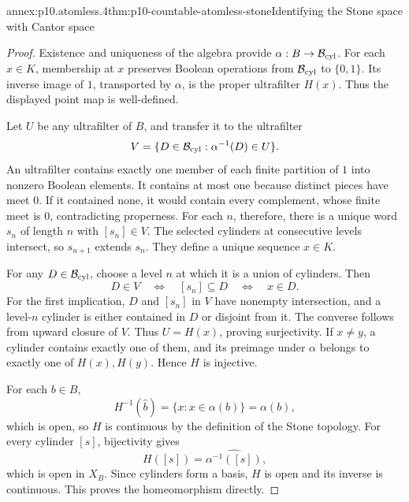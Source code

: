 \begin{annexitem}{annex:p10.atomless.4}{thm:p10-countable-atomless-stone}{Identifying the Stone space with Cantor space}
\begin{proof}
Existence and uniqueness of the algebra provide
\(\alpha:B\to\mathcal B_{\rm cyl}\).
For each \(x\in K\), membership at \(x\) preserves Boolean
operations from \(\mathcal B_{\rm cyl}\) to \(\{0,1\}\).
Its inverse image of \(1\), transported by \(\alpha\), is the
proper ultrafilter \(H(x)\).
Thus the displayed point map is well-defined.

Let \(U\) be any ultrafilter of \(B\), and transfer it to the
ultrafilter
\[
 V=\{D\in\mathcal B_{\rm cyl}:\alpha^{-1}(D)\in U\}.
\]
An ultrafilter contains exactly one member of each finite partition
of \(1\) into nonzero Boolean elements.
It contains at most one because distinct pieces have meet \(0\).
If it contained none, it would contain every complement, whose
finite meet is \(0\), contradicting properness.
For each \(n\), therefore, there is a unique word \(s_n\) of
length \(n\) with \([s_n]\in V\).
The selected cylinders at consecutive levels intersect, so
\(s_{n+1}\) extends \(s_n\).
They define a unique sequence \(x\in K\).

For any \(D\in\mathcal B_{\rm cyl}\), choose a level \(n\)
at which it is a union of cylinders.
Then
\[
 D\in V
 \quad\Longleftrightarrow\quad
 [s_n]\subseteq D
 \quad\Longleftrightarrow\quad x\in D.
\]
For the first implication, \(D\) and \([s_n]\) in \(V\)
have nonempty intersection, and a level-\(n\) cylinder is either
contained in \(D\) or disjoint from it.
The converse follows from upward closure of \(V\).
Thus \(U=H(x)\), proving surjectivity.
If \(x\ne y\), a cylinder contains exactly one of them, and
its preimage under \(\alpha\) belongs to exactly one of
\(H(x),H(y)\).
Hence \(H\) is injective.

For each \(b\in B\),
\[
 H^{-1}(\widehat b)=\{x:x\in\alpha(b)\}=\alpha(b),
\]
which is open, so \(H\) is continuous by the definition of the
Stone topology.
For every cylinder \([s]\), bijectivity gives
\[
 H([s])=\widehat{\alpha^{-1}([s])},
\]
which is open in \(X_B\).
Since cylinders form a basis, \(H\) is open and its inverse
is continuous.
This proves the homeomorphism directly.
\end{proof}
\end{annexitem}


